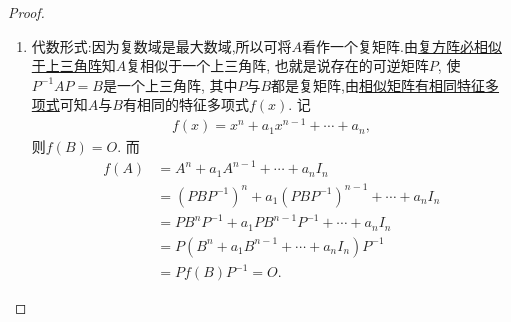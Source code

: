 \documentclass[lang=cn,newtx,10pt,scheme=chinese]{elegantbook}
\begin{document}
\begin{proof}
\begin{enumerate}
\item {\heiti 代数形式:}因为复数域是最大数域,所以可将$A$看作一个复矩阵.由\hyperref[theorem:复方阵必相似于上三角阵]{复方阵必相似于上三角阵}知$A$复相似于一个上三角阵, 也就是说存在的可逆矩阵$P$, 使$P^{-1}AP = B$是一个上三角阵, 其中$P$与$B$都是复矩阵,由\hyperref[theorem:相似矩阵有相同的特征多项式与特征值]{相似矩阵有相同特征多项式}可知$A$与$B$有相同的特征多项式$f(x)$. 记
\begin{align*}
f(x) = x^n + a_1 x^{n-1} + \cdots + a_n,
\end{align*}
则$f(B) = O$. 而
\begin{align*}
f(A) &= A^n + a_1 A^{n-1} + \cdots + a_n I_n \\
&= (PBP^{-1})^n + a_1 (PBP^{-1})^{n-1} + \cdots + a_n I_n \\
&= PB^n P^{-1} + a_1 PB^{n-1} P^{-1} + \cdots + a_n I_n \\
&= P(B^n + a_1 B^{n-1} + \cdots + a_n I_n)P^{-1} \\
&= P f(B) P^{-1} = O.
\end{align*}


\end{enumerate}
\end{proof}
\end{document}
